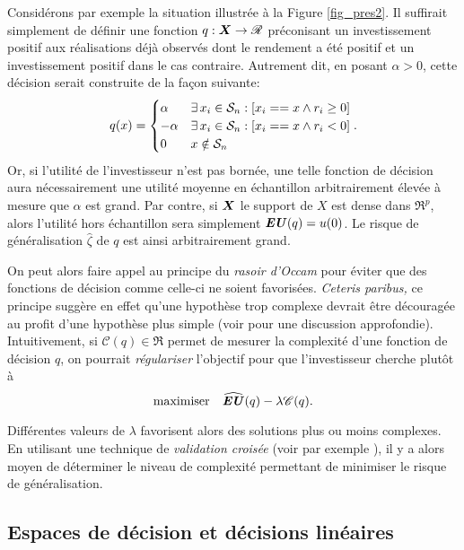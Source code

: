 Considérons par exemple la situation illustrée à la Figure \ref{fig_pres2}. Il suffirait
simplement de définir une fonction $q:\X\to\Re$ préconisant un investissement positif aux
réalisations déjà observés dont le rendement a été positif et un investissement positif
dans le cas contraire. Autrement dit, en posant $\alpha>0$, cette décision serait construite de
la façon suivante:
\begin{equation}
  q(x) =
  \begin{cases}
     \alpha & \exists\,x_i \in \S_n: [x_i == x \wedge r_i \geq 0]\\
    -\alpha & \exists\,x_i \in \S_n: [x_i == x \wedge r_i < 0]\\
     0 & x \notin \S_n
  \end{cases}.
\end{equation}
Or, si l'utilité de l'investisseur n'est pas bornée, une telle fonction de décision aura
nécessairement une utilité moyenne en échantillon arbitrairement élevée à mesure que
$\alpha$ est grand. Par contre, si $\X$ le support de $X$ est dense dans $\Re^p$, alors l'utilité
hors échantillon sera simplement $\EU(q) = u(0)$. Le risque de généralisation $\hat\zeta$ de
$q$ est ainsi arbitrairement grand.

On peut alors faire appel au principe du \textit{rasoir d'Occam} pour éviter que des
fonctions de décision comme celle-ci ne soient favorisées. \textit{Ceteris paribus,} ce
principe suggère en effet qu'une hypothèse trop complexe devrait être découragée au profit
d'une hypothèse plus simple (voir \cite{vapnik1998statistical} pour une discussion
approfondie). Intuitivement, si $\mathscr{C}(q) \in \Re$ permet de mesurer la complexité
d'une fonction de décision $q$, on pourrait \textit{régulariser} l'objectif pour que
l'investisseur cherche plutôt à
\begin{equation}
  \maximizeEquation{\hEU(q) - \lambda\mathscr{C}(q).}
\end{equation}
Différentes valeurs de $\lambda$ favorisent alors des solutions plus ou moins complexes. En
utilisant une technique de \textit{validation croisée} (voir par exemple
\cite{bishop2006pattern}), il y a alors moyen de déterminer le niveau de complexité
permettant de minimiser le risque de généralisation.

\subsection{Espaces de décision et décisions linéaires}

